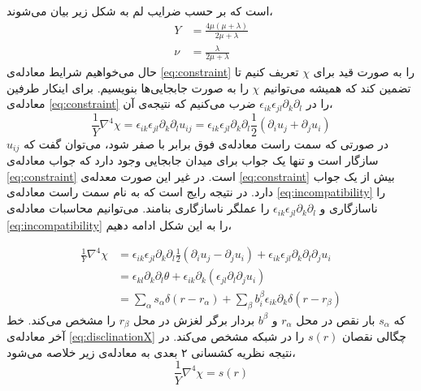 است که بر حسب ضرایب لم به شکل زیر بیان می‌شوند،
\begin{equation}
\begin{aligned}
Y&=\frac{4\mu(\mu+\lambda)}{2\mu+\lambda}\\
\nu&=\frac{\lambda}{2\mu+\lambda}
\label{eq:younglame}
\end{aligned}
\end{equation}
حال می‌خواهیم شرایط معادله‌ی 
\ref{eq:constraint}
را به صورت قید برای $\chi$
تعریف کنیم تا تضمین کند که همیشه می‌توانیم $\chi$
را به صورت جابجایی‌ها بنویسیم. برای اینکار طرفین معادله‌ی 
\ref{eq:constraint}
را در 
$\epsilon_{ik}\epsilon_{jl}\partial_k\partial_l$
ضرب می‌کنیم که نتیجه‌ی آن،
\begin{equation}
\frac{1}{Y}\nabla^4\chi=\epsilon_{ik}\epsilon_{jl}\partial_k\partial_lu_{ij}=\epsilon_{ik}\epsilon_{jl}\partial_k\partial_l\frac{1}{2}(\partial_iu_j+\partial_ju_i)
\label{eq:incompatibility}
\end{equation}
در صورتی که سمت راست معادله‌ی فوق برابر با صفر شود، می‌توان گفت که $u_{ij}$ 
سازگار است و تنها یک جواب برای میدان جابجایی وجود دارد که جواب معادله‌ی 
\ref{eq:constraint}
است. در غیر این صورت معدله‌ی 
\ref{eq:constraint}
بیش از یک جواب دارد. در نتیجه رایج است که به نام سمت راست معادله‌ی
\ref{eq:incompatibility}
را ناسازگاری
و $\epsilon_{ik}\epsilon_{jl}\partial_k\partial_l$
را عملگر ناسازگاری بنامند. می‌توانیم محاسبات معادله‌ی 
\ref{eq:incompatibility}
را به این شکل ادامه دهیم،

\begin{equation}
\begin{aligned}
\frac{1}{Y}\nabla^4\chi&=\epsilon_{ik}\epsilon_{jl}\partial_k\partial_l\frac{1}{2}(\partial_iu_j-\partial_ju_i)+\epsilon_{ik}\epsilon_{jl}\partial_k\partial_l\partial_ju_i\\
&=\epsilon_{kl}\partial_k\partial_l\theta+ \epsilon_{ik}\partial_k(\epsilon_{jl}\partial_l\partial_ju_i)\\
&=\sum_{\alpha}s_\alpha\delta(r-r_\alpha)+\sum_\beta b_i^\beta\epsilon_{ik}\partial_k\delta(r-r_\beta)
\label{eq:disclination}
\end{aligned}
\end{equation}
که $s_\alpha$
بار نقص در محل $r_\alpha$
و $b^\beta$
بردار برگر لغزش در محل $r_\beta$
را مشخص می‌کند. خط آخر معادله‌ی 
\ref{eq:disclinationX}
چگالی نقصان
$s(r)$
 را در شبکه مشخص می‌کند. در نتیجه نظریه کشسانی ۲ بعدی به معادله‌ی زیر خلاصه می‌شود،
\begin{equation}
\frac{1}{Y}\nabla^4\chi=s(r)
\end{equation}

























